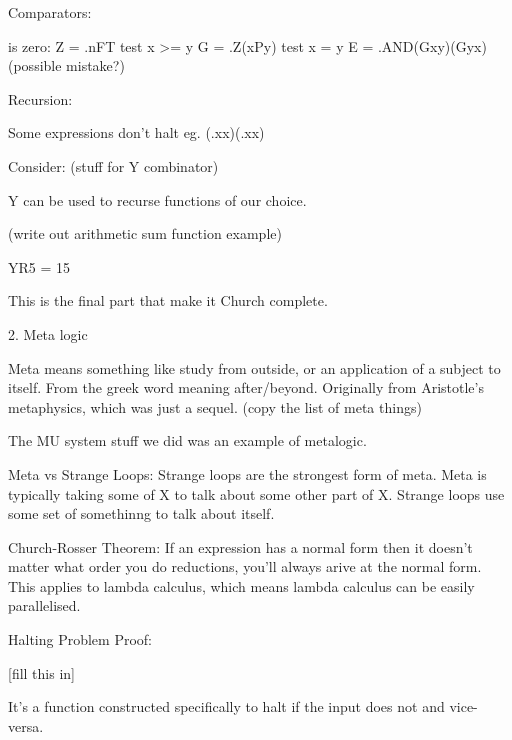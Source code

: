 Comparators:

is zero:
Z = \n.nFT
test x >= y
G = \xy.Z(xPy)
test x = y
E = \xy.AND(Gxy)(Gyx) (possible mistake?)

Recursion:

Some expressions don't halt
eg. (\x.xx)(\x.xx)

Consider:
(stuff for Y combinator)

Y can be used to recurse functions of our choice.

(write out arithmetic sum function example)

YR5 = 15

This is the final part that make it Church complete.

2. Meta logic

Meta means something like study from outside, or an application of a subject to itself. From the greek word meaning after/beyond.
Originally from Aristotle's metaphysics, which was just a sequel.
(copy the list of meta things)

The MU system stuff we did was an example of metalogic.

Meta vs Strange Loops:
Strange loops are the strongest form of meta. Meta is typically taking some of X to talk about some other part of X.
Strange loops use some set of somethinng to talk about itself.

Church-Rosser Theorem:
If an expression has a normal form then it doesn't matter what order you do reductions, you'll always arive at the normal form.
This applies to lambda calculus, which means lambda calculus can be easily parallelised.

Halting Problem Proof:

[fill this in]

It's a function constructed specifically to halt if the input does not and vice-versa.

